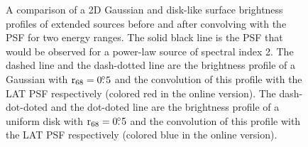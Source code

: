 \documentclass[12pt,preprint]{aastex}
\newif\ifcolorfigure
\newcommand{\rsixeight}{{\ensuremath{\text{r}_{68}}}\xspace}
\begin{document}
\clearpage
\begin{figure}
    \ifcolorfigure
      \plotone{mc_plots/compare_disk_gauss_color.eps}
    \else
    \fi
    \caption{
    A comparison of a 2D Gaussian and disk-like surface brightness profiles
    of extended sources before and after convolving with the PSF for two
    energy ranges.  The solid black line is the PSF that would be observed
    for a power-law source of spectral index 2. The dashed line
    and the dash-dotted line are 
    the brightness profile of a Gaussian with $\rsixeight=0\fdg5$
    and the convolution of this profile with the LAT PSF respectively
    (colored red in the online version).
    The dash-dot-doted and the dot-doted line are the brightness profile
    of a uniform disk with $\rsixeight=0\fdg5$ and the convolution
    of this profile with the LAT PSF respectively (colored blue in the online version).
    }\label{compare_disk_gauss}
  \end{figure}
\end{document}
